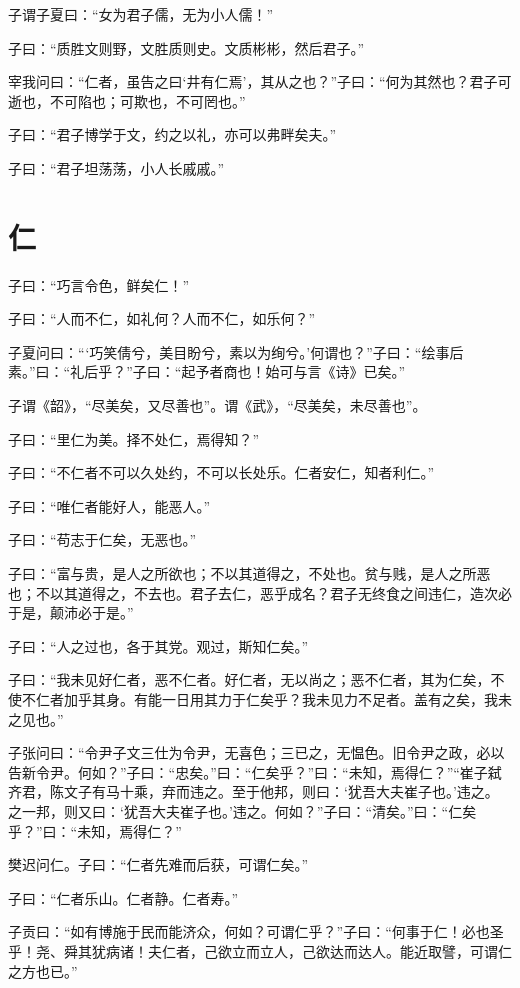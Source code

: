 \documentclass[a5paper]{ctexbook}
\begin{document}
    子谓子夏曰：“女为君子儒，无为小人儒！”

    子曰：“质胜文则野，文胜质则史。文质彬彬，然后君子。”

    宰我问曰：“仁者，虽告之曰‘井有仁焉’，其从之也？”子曰：“何为其然也？君子可逝也，不可陷也；可欺也，不可罔也。”

    子曰：“君子博学于文，约之以礼，亦可以弗畔矣夫。”

    子曰：“君子坦荡荡，小人长戚戚。”

    \chapter{仁}

    子曰：“巧言令色，鲜矣仁！”

    子曰：“人而不仁，如礼何？人而不仁，如乐何？”

    子夏问曰：“‘巧笑倩兮，美目盼兮，素以为绚兮。’何谓也？”子曰：“绘事后素。”曰：“礼后乎？”子曰：“起予者商也！始可与言《诗》已矣。”

    子谓《韶》，“尽美矣，又尽善也”。谓《武》，“尽美矣，未尽善也”。

    子曰：“里仁为美。择不处仁，焉得知？”

    子曰：“不仁者不可以久处约，不可以长处乐。仁者安仁，知者利仁。”

    子曰：“唯仁者能好人，能恶人。”

    子曰：“苟志于仁矣，无恶也。”

    子曰：“富与贵，是人之所欲也；不以其道得之，不处也。贫与贱，是人之所恶也；不以其道得之，不去也。君子去仁，恶乎成名？君子无终食之间违仁，造次必于是，颠沛必于是。”

    子曰：“人之过也，各于其党。观过，斯知仁矣。”

    子曰：“我未见好仁者，恶不仁者。好仁者，无以尚之；恶不仁者，其为仁矣，不使不仁者加乎其身。有能一日用其力于仁矣乎？我未见力不足者。盖有之矣，我未之见也。”

    子张问曰：“令尹子文三仕为令尹，无喜色；三已之，无愠色。旧令尹之政，必以告新令尹。何如？”子曰：“忠矣。”曰：“仁矣乎？”曰：“未知，焉得仁？”“崔子弑齐君，陈文子有马十乘，弃而违之。至于他邦，则曰：‘犹吾大夫崔子也。’违之。之一邦，则又曰：‘犹吾大夫崔子也。’违之。何如？”子曰：“清矣。”曰：“仁矣乎？”曰：“未知，焉得仁？”

    樊迟问仁。子曰：“仁者先难而后获，可谓仁矣。”

    子曰：“仁者乐山。仁者静。仁者寿。”

    子贡曰：“如有博施于民而能济众，何如？可谓仁乎？”子曰：“何事于仁！必也圣乎！尧、舜其犹病诸！夫仁者，己欲立而立人，己欲达而达人。能近取譬，可谓仁之方也已。”
\end{document}
